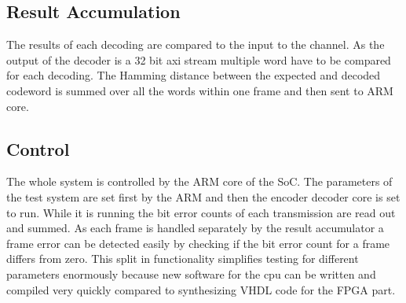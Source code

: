 \subsection{Result Accumulation}
The results of each decoding are compared to the input to the channel. As the output of the decoder is a 32 bit axi stream multiple word have to be compared for each decoding. The Hamming distance between the expected and decoded codeword is summed over all the words within one frame and then sent to ARM core.

\subsection{Control}
The whole system is controlled by the ARM core of the SoC. The parameters of the test system are set first by the ARM and then the encoder decoder core is set to run. While it is running the bit error counts of each transmission are read out and summed. As each frame is handled separately by the result accumulator a frame error can be detected easily by checking if the bit error count for a frame differs from zero. This split in functionality simplifies testing for different parameters enormously because new software for the cpu can be written and compiled very quickly compared to synthesizing VHDL code for the FPGA part.


